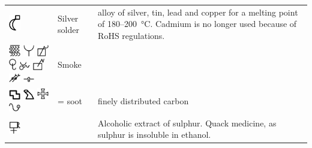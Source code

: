 \documentclass[british,final,landscape]{scrartcl}
\begin{document}
\begin{refsection}
\begin{supertabular}{p{0.3\textwidth}p{0.34\textwidth}p{0.34\textwidth}}
   \includegraphics[width=5mm]{Mixtures/SilverSolder} & Silver solder & alloy of silver, tin, lead and copper for a melting point of \num{180}--\SI{200}{\celsius}. Cadmium is no longer used because of \acs{RoHS} regulations.\\
   \includegraphics[width=5mm]{Mixtures/Smoke}  \includegraphics[width=5mm]{Mixtures/Smoke2} \includegraphics[width=5mm]{Mixtures/Smoke3} \includegraphics[height=5mm]{Mixtures/Smoke4} \includegraphics[width=5mm]{Mixtures/Smoke5} \includegraphics[width=5mm]{Mixtures/Smoke6} \includegraphics[width=5mm]{Mixtures/Smoke7} \includegraphics[width=5mm]{Mixtures/Smoke8} & Smoke & \\
   \includegraphics[width=5mm]{Mixtures/Soot} \includegraphics[width=5mm]{Mixtures/Soot2} \includegraphics[width=5mm]{Mixtures/Soot3} \includegraphics[width=5mm]{Mixtures/Soot4} &  = soot & finely distributed carbon \\
   \includegraphics[width=5mm]{Mixtures/SulphurTartaris} &  & Alcoholic extract of sulphur. Quack medicine, as sulphur is insoluble in ethanol. \\

\end{supertabular}
\end{refsection}
\end{document}
